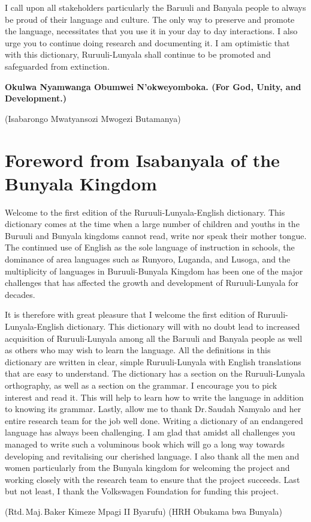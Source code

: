 I call upon all stakeholders particularly the Baruuli and Banyala people to always be proud of their language and culture. 
The only way to preserve and promote the language, necessitates that you use it in your day to day interactions. I also urge you to continue doing research and documenting it. I am optimistic that with this dictionary, Ru\-ruu\-li\hyp{}Lu\-nya\-la shall continue to be promoted and safeguarded from extinction.\bigskip

\noindent \textbf{Okulwa Nyamwanga Obumwei N’okweyomboka. (For God, Unity, and Development.)}

\noindent (Isabarongo Mwatyansozi Mwogezi Butamanya)


\section*{Foreword from Isabanyala of the Bunyala Kingdom}\label{sec-foreword-2}

Welcome to the first edition of the Ru\-ruu\-li\hyp{}Lu\-nya\-la-English dictionary. This dictionary comes at the time when a large number of children and youths in the Buruuli and Bunyala kingdoms cannot read, write nor speak their mother tongue. 
The continued use of English as the sole language of instruction in schools, the dominance of area languages such as Runyoro, Luganda, and Lusoga, and the multiplicity of languages in Buruuli-Bunyala Kingdom has been one of the major challenges that has affected the growth and development of Ru\-ruu\-li\hyp{}Lu\-nya\-la for decades. 

It is therefore with great pleasure that I welcome the first edition of Ru\-ruu\-li\hyp{}Lu\-nya\-la-English dictionary. 
This dictionary will with no doubt lead to increased acquisition of Ru\-ruu\-li\hyp{}Lu\-nya\-la among all the Baruuli and Banyala people as well as others who may wish to learn the language. 
All the definitions in this dictionary are written in clear, simple Ru\-ruu\-li\hyp{}Lu\-nya\-la with English translations that are easy to understand. 
The dictionary has a section on the Ru\-ruu\-li\hyp{}Lu\-nya\-la orthography, as well as a section on the grammar. I encourage you to pick interest and read it. This will help to learn how to write the language in addition to knowing its grammar. 
Lastly, allow me to thank Dr.\,Saudah Namyalo and her entire research team for the job well done. Writing a dictionary of an endangered language has always been challenging. 
I am glad that amidst all challenges you managed to write such a voluminous book which will go a long way towards developing and revitalising our cherished language. I also thank all the men and women particularly from the Bunyala kingdom for welcoming the project and working closely with the research team to ensure that the project succeeds. Last but not least, I thank the Volkswagen Foundation for funding this project.\bigskip

\noindent (Rtd.\,Maj.\,Baker Kimeze Mpagi II Byarufu)
\noindent (HRH Obukama bwa Bunyala)
